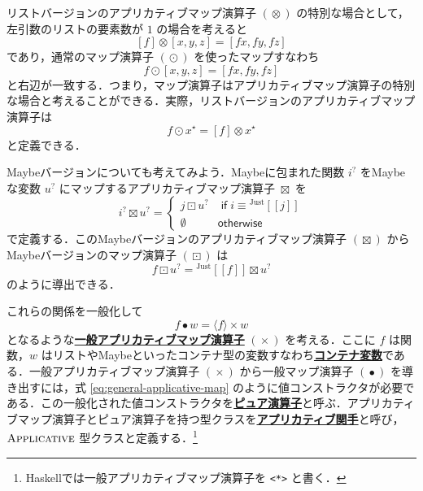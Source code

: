 \documentclass[a4paper,twocolumn]{jsbook}
\def\[{\left[\!\left[}
\def\]{\right]\!\right]}
\newcommand{\programminglanguage}[1]{\textsf{#1}}
\newcommand{\haskell}{\programminglanguage{Haskell}}
\newcommand{\keyword}[1]{{\underline{\textbf{#1}}}}
\newcommand{\code}[1]{\texttt{#1}}
\newcommand{\mKeyword}[1]{\mathsf{#1}} %
\newcommand{\mIfKeyword}{\mKeyword{if}}
\newcommand{\mOtherwiseKeyword}{\mKeyword{otherwise}}
\DeclareMathOperator{\mIf}{\mIfKeyword}
\DeclareMathOperator{\mOtherwise}{\mOtherwiseKeyword}
\newcommand{\mNothing}{\emptyset}
\DeclareMathOperator{\mAppMap}{\times}
\DeclareMathOperator{\mAppMapList}{\otimes}
\DeclareMathOperator{\mAppMapMaybe}{\boxtimes}
\DeclareMathOperator{\mLogicalAnd}{\wedge}
\DeclareMathOperator{\mMap}{\bullet}
\DeclareMathOperator{\mMapList}{\odot}
\DeclareMathOperator{\mMapMaybe}{\boxdot}
\newcommand{\mGenericValueConstructor}[1]{\mathrm{#1}}
\newcommand{\mGenericWith}[2]{{}^\mGenericValueConstructor{#1}\[#2\]}
\newcommand{\mJustWith}[1]{\mGenericWith{Just}{#1}}
\newcommand{\mListWith}[1]{\left[#1\right]}
\newcommand{\mPureWith}[1]{\langle#1\rangle}
\newcommand{\mGenericTypeClass}[1]{\textsc{#1}} %
\newcommand{\mApplicativeTypeClass}{\mGenericTypeClass{Applicative}}
\newcommand{\mList}[1]{{#1}^\mathrm{\star}}
\newcommand{\mMaybe}[1]{{#1}^?}
\begin{document}
リストバージョンのアプリカティブマップ演算子 $(\mAppMapList)$ の特別な場合として，左引数のリストの要素数が $1$ の場合を考えると
\begin{equation}
\mListWith{f}\mAppMapList\mListWith{x,y,z}
=\mListWith{fx,fy,fz}
\end{equation}
であり，通常のマップ演算子 $(\mMapList)$ を使ったマップすなわち
\begin{equation}
f\mMapList\mListWith{x,y,z}
=\mListWith{fx,fy,fz}
\end{equation}
と右辺が一致する．つまり，マップ演算子はアプリカティブマップ演算子の特別な場合と考えることができる．実際，リストバージョンのアプリカティブマップ演算子は
\begin{equation}
f\mMapList\mList{x}
=\mListWith{f}\mAppMapList\mList{x}
\end{equation}
と定義できる．

Maybeバージョンについても考えてみよう．Maybeに包まれた関数 $\mMaybe{i}$ をMaybeな変数 $\mMaybe{u}$ にマップするアプリカティブマップ演算子 $\mAppMapMaybe$ を
\begin{equation}
\mMaybe{i}\mAppMapMaybe\mMaybe{u}
=\begin{cases}
j\mMapMaybe\mMaybe{u}&\mIf i\equiv\mJustWith{j}\\
\mNothing&\mOtherwise
\end{cases}
\end{equation}
で定義する．このMaybeバージョンのアプリカティブマップ演算子 $(\mAppMapMaybe)$ からMaybeバージョンのマップ演算子 $(\mMapMaybe)$ は
\begin{equation}
f\mMapMaybe\mMaybe{u}
=\mJustWith{f}\mAppMapMaybe\mMaybe{u}
\end{equation}
のように導出できる．

これらの関係を一般化して
\begin{equation}
\label{eq:general-applicative-map}
f\mMap w=\mPureWith{f}\mAppMap w
\end{equation}
となるような\keyword{一般アプリカティブマップ演算子} $(\mAppMap)$ を考える．ここに $f$ は関数，$w$ はリストやMaybeといったコンテナ型の変数すなわち\keyword{コンテナ変数}である．一般アプリカティブマップ演算子 $(\mAppMap)$ から一般マップ演算子 $(\mMap)$ を導き出すには，式 \eqref{eq:general-applicative-map} のように値コンストラクタが必要である．この一般化された値コンストラクタを\keyword{ピュア演算子}と呼ぶ．アプリカティブマップ演算子とピュア演算子を持つ型クラスを\keyword{アプリカティブ関手}と呼び，$\mApplicativeTypeClass$ 型クラスと定義する．\footnote{\haskell では一般アプリカティブマップ演算子を \code{<*>} と書く．}
\end{document}
